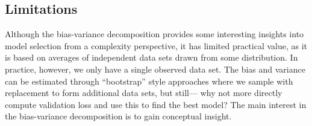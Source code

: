 \documentclass[12pt,letterpaper]{article}
\begin{document}

\subsection{Limitations}
Although the bias-variance decomposition provides some interesting insights into model selection from a complexity perspective, it has limited practical value, as it is based on averages of independent data sets drawn from some distribution. In practice, however, we only have a single observed data set.
The bias and variance can be estimated through ``bootstrap'' style
approaches where we sample with replacement to form additional
data sets, but still--- why not more directly compute validation loss
and use this to find the best model? The main interest in the bias-variance decomposition is to gain conceptual insight.
\end{document}
